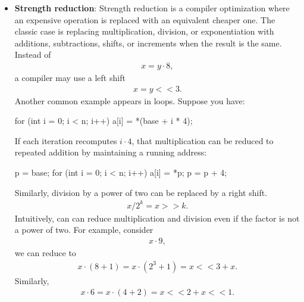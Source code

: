 \documentclass{report}
\begin{document}
\begin{itemize}
                If a + b does not change during the loop, then computing it every iteration is wasteful. A compiler can hoist it outside the loop:
            \item \textbf{Strength reduction}: Strength reduction is a compiler optimization where an expensive operation is replaced with an equivalent cheaper one.
                \bigbreak \noindent 
                The classic case is replacing multiplication, division, or exponentiation with additions, subtractions, shifts, or increments when the result is the same.
                \bigbreak \noindent 
                Instead of 
                \begin{align*}
                    x = y \cdot  8
                ,\end{align*}
                a compiler may use a left shift
                \begin{align*}
                    x = y << 3
                .\end{align*}
                Another common example appears in loops. Suppose you have:
                \bigbreak \noindent 
                \begin{cppcode}
                    for (int i = 0; i < n; i++) {
                        a[i] = *(base + i * 4);
                    }
                \end{cppcode}
                \bigbreak \noindent 
                If each iteration recomputes $i \cdot  4$, that multiplication can be reduced to repeated addition by maintaining a running address:
                \bigbreak \noindent 
                \begin{cppcode}
                    p = base;
                    for (int i = 0; i < n; i++) {
                        a[i] = *p;
                        p = p + 4;
                    }
                \end{cppcode}
                Similarly, division by a power of two can be replaced by a right shift.
                \begin{align*}
                    x / 2^{k} = x>>k
                .\end{align*}
                Intuitively, can can reduce multiplication and division even if the factor is not a power of two. For example, consider
                \begin{align*}
                    x \cdot 9
                ,\end{align*}
                we can reduce to 
                \begin{align*}
                    x \cdot (8+1) = x \cdot (2^{3} + 1) = x<<3 + x
                .\end{align*}
                Similarly, 
                \begin{align*}
                    x \cdot 6 = x\cdot (4+2) = x<<2 + x<<1
                .\end{align*}

        \end{itemize}
\end{document}
